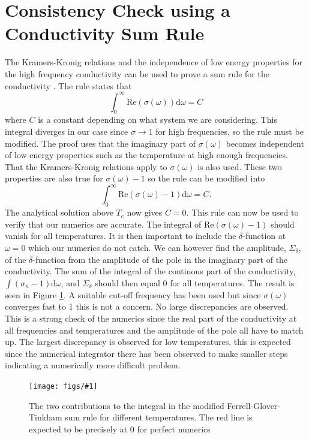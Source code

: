 \documentclass[12pt]{report}
\renewcommand{\d}{\ensuremath{\mathrm{d}}}
\newcommand{\re}{\ensuremath{\mathrm{Re}}}
\newcommand{\fig}[2]{
\begin{figure}
\centering
\texttt{[image: figs/\#1]}
\caption{#2}
\end{figure}
}
\begin{document}
\section{Consistency Check using a Conductivity Sum Rule}
The Kramers-Kronig relations and the independence of low energy properties for the high frequency conductivity can be used to prove a sum rule for the conductivity \cite{PhysRev.109.1398}. The rule states that
\begin{equation}
 \int_0^\infty\re(\sigma(\omega))\d\omega=C
\end{equation}
where $C$ is a constant depending on what system we are considering. This integral diverges in our case since $\sigma\rightarrow1$ for high frequencies, so the rule must be modified. The proof uses that the imaginary part of $\sigma(\omega)$ becomes independent of low energy properties such as the temperature at high enough frequencies. That the Kramers-Kronig relations apply to $\sigma(\omega)$ is also used. These two properties are also true for $\sigma(\omega)-1$ so the rule can be modified into
\begin{equation}
 \int_0^\infty\re(\sigma(\omega)-1)\d\omega=C.
\end{equation}
The analytical solution above $T_c$ now gives $C=0$. This rule can now be used to verify that our numerics are accurate. The integral of $\re(\sigma(\omega)-1)$ should vanish for all temperatures. It is then important to include the $\delta$-function at $\omega=0$ which our numerics do not catch. We can however find the amplitude, $\Sigma_\delta$, of the $\delta$-function from the amplitude of the pole in the imaginary part of the conductivity. The sum of the integral of the continous part of the conductivity, $\int(\sigma_n-1)\d \omega$, and $\Sigma_\delta$ should then equal 0 for all temperatures. The result is seen in Figure \ref{f:sum}. A suitable cut-off frequency has been used but since $\sigma(\omega)$ converges fast to 1 this is not a concern. No large discrepancies are observed. This is a strong check of the numerics since the real part of the conductivity at all frequencies and temperatures and the amplitude of the pole all have to match up. The largest discrepancy is observed for low temperatures, 
this is expected since the numerical integrator there has been observed to make smaller steps indicating a numerically more difficult problem.

\fig{sum_rule_a20}{The two contributions to the integral in the modified Ferrell-Glover-Tinkham sum rule for different temperatures. The red line is expected to be precisely at 0 for perfect numerics\label{f:sum}}
\end{document}
